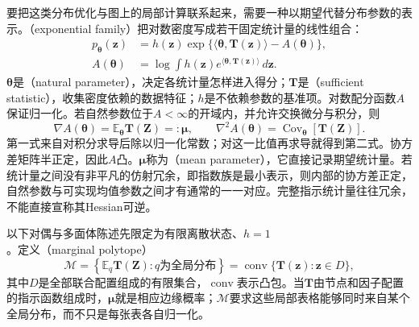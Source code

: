 要把这类分布优化与图上的局部计算联系起来，需要一种以期望代替分布参数的表示。（exponential family）把对数密度写成若干固定统计量的线性组合：
\begin{equation}
  \begin{aligned}
    p_{\bm{\theta}}(\bm{z})
      &=h(\bm{z})\exp\{\langle\bm{\theta},\bm{T}(\bm{z})\rangle
                      -A(\bm{\theta})\},\\
    A(\bm{\theta})
      &=\log\int h(\bm{z})
          e^{\langle\bm{\theta},\bm{T}(\bm{z})\rangle}\,d\bm{z}.
  \end{aligned}
  \label{eq:pgm-variational-exponential-family}
\end{equation}
$\bm{\theta}$是（natural parameter），决定各统计量怎样进入得分；$\bm{T}$是（sufficient statistic），收集密度依赖的数据特征；$h$是不依赖参数的基准项。对数配分函数$A$保证归一化。若自然参数位于$A<\infty$的开域内，并允许交换微分与积分，则
\begin{equation}
  \nabla A(\bm{\theta})=\mathbb E_{\bm{\theta}}\bm{T}(\bm{Z})
      =:\bm{\mu},\qquad
  \nabla^2 A(\bm{\theta})
      =\operatorname{Cov}_{\bm{\theta}}[\bm{T}(\bm{Z})].
  \label{eq:pgm-variational-moments}
\end{equation}
第一式来自对积分求导后除以归一化常数；对这一比值再求导就得到第二式。协方差矩阵半正定，因此$A$凸。$\bm{\mu}$称为（mean parameter），它直接记录期望统计量。若统计量之间没有非平凡的仿射冗余，即指数族是最小表示，则内部的协方差正定，自然参数与可实现均值参数之间才有通常的一一对应。完整指示统计量往往冗余，不能直接宣称其Hessian可逆。

以下对偶与多面体陈述先限定为有限离散状态、$h=1$。定义（marginal polytope）
\begin{equation}
  \mathcal M
    =\left\{\mathbb E_q\bm{T}(\bm{Z}):q\text{为全局分布}\right\}
    =\operatorname{conv}\{\bm{T}(\bm{z}):\bm{z}\in D\},
  \label{eq:pgm-variational-marginal-polytope}
\end{equation}
其中$D$是全部联合配置组成的有限集合，$\operatorname{conv}$表示凸包。当$\bm{T}$由节点和因子配置的指示函数组成时，$\bm{\mu}$就是相应边缘概率；$\mathcal M$要求这些局部表格能够同时来自某个全局分布，而不只是每张表各自归一化。


